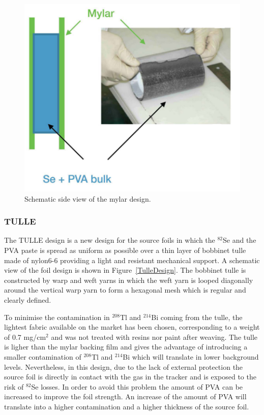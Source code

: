 \documentclass[main.tex]{subfiles}
\begin{document}
\begin{figure}[h!]
\centering
\includegraphics[scale=0.2]{pictures/Chap4/MylarDesign.png}
\caption{Schematic side view of the mylar design.}
\label{MylarDesign}
\end{figure}


\FloatBarrier


\subsubsection{TULLE}


\NI The TULLE design is a new design for the source foils in which the $^{\text{82}}$Se and the PVA paste is spread as uniform as possible over a thin layer of bobbinet tulle made of nylon6-6 providing a light and resistant mechanical support. A schematic view of the foil design is shown in Figure~\ref{TulleDesign}. The bobbinet tulle is constructed by warp and weft yarns in which the weft yarn is looped diagonally around the vertical warp yarn to form a hexagonal mesh which is regular and clearly defined.


\bigskip


\NI To minimise the contamination in $^{\text{208}}$Tl and $^{\text{214}}$Bi coming from the tulle, the lightest fabric available on the market has been chosen, corresponding to a weight of 0.7 mg/cm$^\text{2}$ and was not treated with resins nor paint after weaving. The tulle is ligher than the mylar backing film and gives the advantage of introducing a smaller contamination of $^{\text{208}}$Tl and $^{\text{214}}$Bi which will translate in lower background levels. Nevertheless, in this design, due to the lack of external protection the source foil is directly in contact with the gas in the tracker and is exposed to the risk of $^{\text{82}}$Se losses. In order to avoid this problem the amount of PVA can be increased to improve the foil strength. An increase of the amount of PVA will translate into a higher contamination and a higher thickness of the source foil. 
\end{document}
